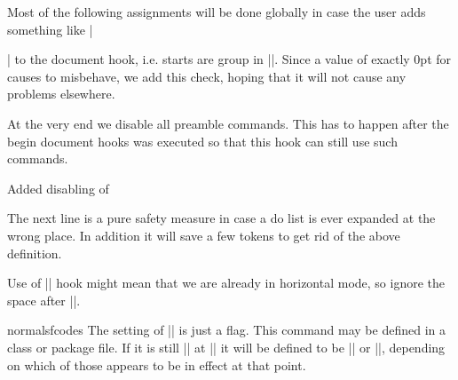     Most of the following assignments will be done globally in case
    the user adds something like |\begin{multicols}| to the document
    hook, i.e. starts are group in ||.
    Since a value of exactly 0pt for  causes
     to misbehave, we add this check, hoping
    that it will not cause any problems elsewhere.
  \begin{teX}
  \ifdim\topskip<1sp\global\topskip 1sp\relax\fi
  \global\@maxdepth\maxdepth
  \global\let\@begindocumenthook\@undefined
  \ifx\@listfiles\@undefined
    \global\let\@filelist\relax
    \global\let\@addtofilelist\@gobble
  \fi
  \end{teX}

    At the very end we disable all preamble commands. This has to
    happen after the begin document hooks was executed so that this
    hook can still use such commands.


   Added disabling of 
  \begin{teX}
  \global\let \@nodocument \relax
  \end{teX}
   The next line is a pure safety measure in case a do list is ever
   expanded at the wrong place. In addition it will save a few
   tokens to get rid of the above definition.
  \begin{teX}
  \global\let\do\noexpand
  \end{teX}

    Use of |\AtBeginDocument| hook might mean that we are already in
    horizontal mode, so ignore the space after ||.
  \begin{teX}
  \ignorespaces}
  \end{teX}

  \begin{teX}
\@onlypreamble\document
  \end{teX}

 \begin{docCommand}{normalsfcodes}{}
 The setting of |\@empty| is just a flag. This command may be defined
 in a class or package file. If it is still |\@empty| at 
 || it will be defined to be |\frenchspacing| or
 |\nonfrenchspacing|, depending on which of those appears to be in
 effect at that point.
 \end{docCommand}
    \begin{teX}
\let\normalsfcodes\@empty
    \end{teX}



\end{multicols}
